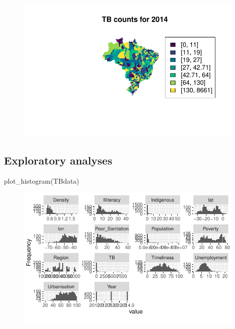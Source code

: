 \documentclass[
  letterpaper,
  DIV=11,
  numbers=noendperiod]{scrartcl}
\newenvironment{Shaded}{\begin{snugshade}}{\end{snugshade}}
\newcommand{\FunctionTok}[1]{\textcolor[rgb]{0.28,0.35,0.67}{#1}}
\newcommand{\NormalTok}[1]{\textcolor[rgb]{0.00,0.23,0.31}{#1}}
\begin{document}
\begin{figure}[H]

{\centering \includegraphics{Group34Coursework_files/figure-pdf/unnamed-chunk-2-1.pdf}

}

\end{figure}

\hypertarget{exploratory-analyses}{%
\subsection{Exploratory analyses}\label{exploratory-analyses}}

\begin{Shaded}
\begin{Highlighting}[]
\FunctionTok{plot\_histogram}\NormalTok{(TBdata)}
\end{Highlighting}
\end{Shaded}

\begin{figure}[H]

{\centering \includegraphics{Group34Coursework_files/figure-pdf/unnamed-chunk-5-1.pdf}

}

\end{figure}
\end{document}
